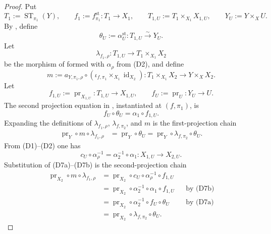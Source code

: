 \begin{proof}
  Put
  \[
    T_1:=\operatorname{ST}_{\pi_1}(Y),\qquad
    f_1:=f^{\mathrm{st}}_{\pi_1}\colon T_1\to X_1,\qquad
    T_{1,U}:=T_1\times_{X_1}X_{1,U},\qquad
    Y_U:=Y\times_XU.
  \]
  By , define
  \[
    \theta_U:=\alpha_U^{\mathrm{st}}\colon
      T_{1,U}\xrightarrow{\sim}Y_U.                               \tag{D6}
  \]
  Let
  \[
    \lambda_{f_1,\rho}\colon T_{1,U}\longrightarrow T_1\times_{X_1}X_2
  \]
  be the morphism of  formed with
  $\alpha_\rho$ from (D2), and define
  \[
    m:=a_{Y,\pi_1,\rho}\circ
      (\iota_{f,\pi_1}\times_{X_1}\operatorname{id}_{X_2})
      \colon T_1\times_{X_1}X_2\longrightarrow Y\times_XX_2.      \tag{D7}
  \]
  Let
  \[
    f_{1,U}:=\operatorname{pr}_{X_{1,U}}\colon T_{1,U}\to X_{1,U},
    \qquad
    f_U:=\operatorname{pr}_U\colon Y_U\to U.
  \]
  The second projection equation in
  , instantiated at
  $(f,\pi_1)$, is
  \[
    f_U\circ\theta_U=\alpha_1\circ f_{1,U}.                        \tag{D7a}
  \]
  Expanding the definitions of $\lambda_{f_1,\rho}$,
  $\lambda_{f,\pi_2}$, and $m$ is the first-projection chain
  \[
  \begin{aligned}
    \operatorname{pr}_Y\circ m\circ\lambda_{f_1,\rho}
      &=\operatorname{pr}_Y\circ\theta_U
       =\operatorname{pr}_Y\circ\lambda_{f,\pi_2}\circ\theta_U.
  \end{aligned}
  \]
  From (D1)--(D2) one has
  \[
    c_U\circ\alpha_\rho^{-1}
      =\alpha_2^{-1}\circ\alpha_1\colon X_{1,U}\to X_{2,U}.        \tag{D7b}
  \]
  Substitution of (D7a)--(D7b) is the second-projection chain
  \[
  \begin{aligned}
    \operatorname{pr}_{X_2}\circ m\circ\lambda_{f_1,\rho}
      &=\operatorname{pr}_{X_2}\circ c_U\circ\alpha_\rho^{-1}
          \circ f_{1,U}\\
      &=\operatorname{pr}_{X_2}\circ\alpha_2^{-1}\circ\alpha_1
          \circ f_{1,U} &&\text{by (D7b)}\\
      &=\operatorname{pr}_{X_2}\circ\alpha_2^{-1}\circ f_U\circ\theta_U
          &&\text{by (D7a)}\\
      &=\operatorname{pr}_{X_2}\circ\lambda_{f,\pi_2}\circ\theta_U.

\end{aligned}\]
\end{proof}

